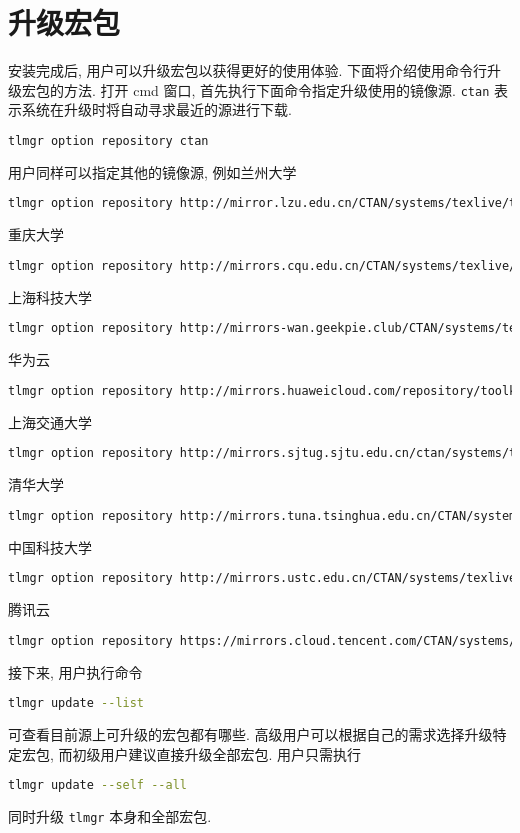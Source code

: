 \documentclass{ctexrep}
\begin{document}
\section{升级宏包}
安装完成后, 用户可以升级宏包以获得更好的使用体验. 
下面将介绍使用命令行升级宏包的方法. 
打开 \textsf{cmd} 窗口, 首先执行下面命令指定升级使用的镜像源. 
\texttt{ctan} 表示系统在升级时将自动寻求最近的源进行下载. 
\begin{lstlisting}[language=bash]
  tlmgr option repository ctan
\end{lstlisting}
用户同样可以指定其他的镜像源, 例如兰州大学
\begin{lstlisting}[language=bash]
  tlmgr option repository http://mirror.lzu.edu.cn/CTAN/systems/texlive/tlnet
\end{lstlisting}
重庆大学
\begin{lstlisting}[language=bash]
  tlmgr option repository http://mirrors.cqu.edu.cn/CTAN/systems/texlive/tlnet
\end{lstlisting}
上海科技大学
\begin{lstlisting}[language=bash]
  tlmgr option repository http://mirrors-wan.geekpie.club/CTAN/systems/texlive/tlnet
\end{lstlisting}
华为云
\begin{lstlisting}[language=bash]
  tlmgr option repository http://mirrors.huaweicloud.com/repository/toolkit/CTAN/systems/texlive/tlnet
\end{lstlisting}
上海交通大学
\begin{lstlisting}[language=bash]
  tlmgr option repository http://mirrors.sjtug.sjtu.edu.cn/ctan/systems/texlive/tlnet
\end{lstlisting}
清华大学
\begin{lstlisting}[language=bash]
  tlmgr option repository http://mirrors.tuna.tsinghua.edu.cn/CTAN/systems/texlive/tlnet
\end{lstlisting}
中国科技大学
\begin{lstlisting}[language=bash]
  tlmgr option repository http://mirrors.ustc.edu.cn/CTAN/systems/texlive/tlnet
\end{lstlisting}
腾讯云
\begin{lstlisting}[language=bash]
  tlmgr option repository https://mirrors.cloud.tencent.com/CTAN/systems/texlive/tlnet
\end{lstlisting}
接下来, 用户执行命令
\begin{lstlisting}[language=bash]
  tlmgr update --list
\end{lstlisting}
可查看目前源上可升级的宏包都有哪些. 
高级用户可以根据自己的需求选择升级特定宏包, 而初级用户建议直接升级全部宏包. 
用户只需执行
\begin{lstlisting}[language=bash]
  tlmgr update --self --all
\end{lstlisting}
同时升级 \texttt{tlmgr} 本身和全部宏包. 
\end{document}
